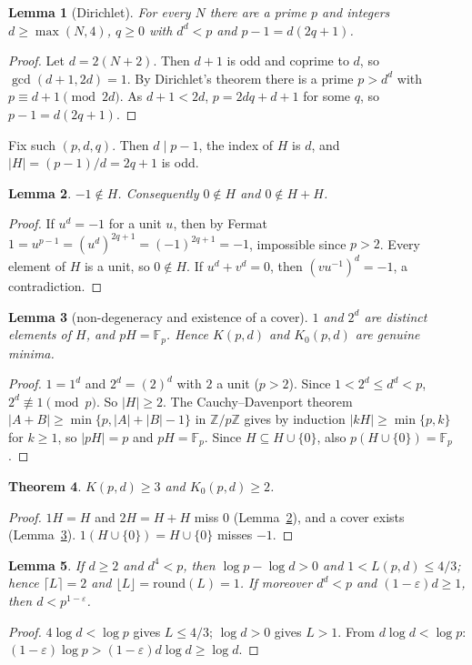 \documentclass[11pt]{article}
\newtheorem{theorem}{Theorem}
\newtheorem{lemma}[theorem]{Lemma}
\theoremstyle{definition}
\newcommand{\Fp}{\mathbb{F}_p}
\begin{document}
\begin{lemma}[Dirichlet]\label{lem:fam}
For every $N$ there are a prime $p$ and integers $d\ge\max(N,4)$, $q\ge0$ with $d^d<p$ and
$p-1=d(2q+1)$.
\end{lemma}
\begin{proof}
Let $d=2(N+2)$. Then $d+1$ is odd and coprime to $d$, so $\gcd(d+1,2d)=1$. By Dirichlet's theorem
there is a prime $p>d^d$ with $p\equiv d+1\pmod{2d}$. As $d+1<2d$, $p=2dq+d+1$ for some $q$, so
$p-1=d(2q+1)$.
\end{proof}

Fix such $(p,d,q)$. Then $d\mid p-1$, the index of $H$ is $d$, and $|H|=(p-1)/d=2q+1$ is odd.

\begin{lemma}\label{lem:neg1}
$-1\notin H$. Consequently $0\notin H$ and $0\notin H+H$.
\end{lemma}
\begin{proof}
If $u^d=-1$ for a unit $u$, then by Fermat $1=u^{p-1}=(u^d)^{2q+1}=(-1)^{2q+1}=-1$, impossible
since $p>2$. Every element of $H$ is a unit, so $0\notin H$. If $u^d+v^d=0$, then
$(vu^{-1})^d=-1$, a contradiction.
\end{proof}

\begin{lemma}[non-degeneracy and existence of a cover]\label{lem:cover}
$1$ and $2^d$ are distinct elements of $H$, and $pH=\Fp$. Hence $K(p,d)$ and $K_0(p,d)$ are
genuine minima.
\end{lemma}
\begin{proof}
$1=1^d$ and $2^d=(2)^d$ with $2$ a unit ($p>2$). Since $1<2^d\le d^d<p$, $2^d\not\equiv1\pmod p$.
So $|H|\ge2$. The Cauchy--Davenport theorem $|A+B|\ge\min\{p,|A|+|B|-1\}$ in $\mathbb{Z}/p\mathbb{Z}$
gives by induction $|kH|\ge\min\{p,k\}$ for $k\ge1$, so $|pH|=p$ and $pH=\Fp$. Since
$H\subseteq H\cup\{0\}$, also $p(H\cup\{0\})=\Fp$.
\end{proof}

\begin{theorem}\label{thm:lower}
$K(p,d)\ge 3$ and $K_0(p,d)\ge2$.
\end{theorem}
\begin{proof}
$1H=H$ and $2H=H+H$ miss $0$ (Lemma~\ref{lem:neg1}), and a cover exists (Lemma~\ref{lem:cover}).
$1(H\cup\{0\})=H\cup\{0\}$ misses $-1$.
\end{proof}

\begin{lemma}\label{lem:L}
If $d\ge2$ and $d^4<p$, then $\log p-\log d>0$ and $1<L(p,d)\le 4/3$; hence $\lceil L\rceil=2$ and
$\lfloor L\rfloor=\mathrm{round}(L)=1$. If moreover $d^d<p$ and $(1-\varepsilon)d\ge1$, then
$d<p^{1-\varepsilon}$.
\end{lemma}
\begin{proof}
$4\log d<\log p$ gives $L\le 4/3$; $\log d>0$ gives $L>1$. From $d\log d<\log p$:
$(1-\varepsilon)\log p>(1-\varepsilon)d\log d\ge\log d$.
\end{proof}
\end{document}
